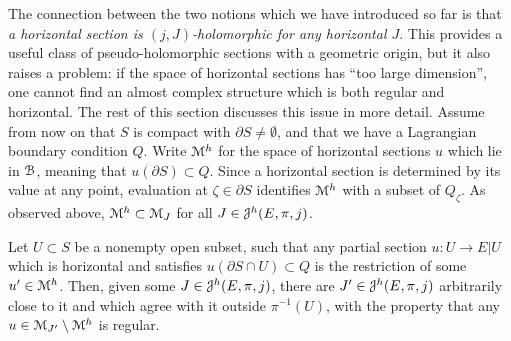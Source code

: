 \documentclass[10pt,letterpaper]{article}
\begin{document}
The connection between the two notions which we have introduced so far is that
{\em a horizontal section is $(j,J)$-holomorphic for any horizontal $J$}. This
provides a useful class of pseudo-holomorphic sections with a geometric origin,
but it also raises a problem: if the space of horizontal sections has ``too
large dimension'', one cannot find an almost complex structure which is both
regular and horizontal. The rest of this section discusses this issue in more
detail. Assume from now on that $S$ is compact with $\partial S \neq
\emptyset$, and that we have a Lagrangian boundary condition $Q$. Write $\mathcal{M}^h$
for the space of horizontal sections $u$ which lie in $\mathcal{B}$, meaning that
$u(\partial S) \subset Q$. Since a horizontal section is determined by its
value at any point, evaluation at $\zeta \in \partial S$ identifies $\mathcal{M}^h$
with a subset of $Q_\zeta$. As observed above, $\mathcal{M}^h \subset \mathcal{M}_J$ for all $J
\in \mathcal{J}^h(E,\pi,j)$.

\begin{lemma} \label{th:horizontal-transversality}
Let $U \subset S$ be a nonempty open subset, such that any partial section $u:
U \rightarrow E|U$ which is horizontal and satisfies $u(\partial S \cap U)
\subset Q$ is the restriction of some $u' \in \mathcal{M}^h$. Then, given some $J \in
\mathcal{J}^h(E,\pi,j)$, there are $J' \in \mathcal{J}^h(E,\pi,j)$ arbitrarily close to it and
which agree with it outside $\pi^{-1}(U)$, with the property that any $u \in
\mathcal{M}_{J'} \setminus \mathcal{M}^h$ is regular.
\end{lemma}
\end{document}
